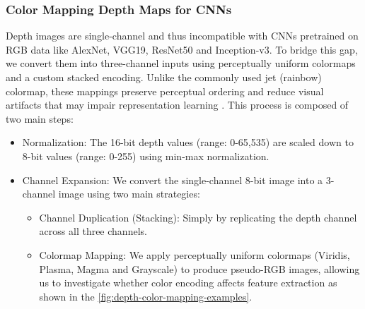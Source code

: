 
\subsubsection{Color Mapping Depth Maps for CNNs}
Depth images are single-channel and thus incompatible with CNNs pretrained on RGB data like AlexNet, VGG19, ResNet50 and Inception-v3. To bridge this gap, we convert them into three-channel inputs using perceptually uniform colormaps and a custom stacked encoding. Unlike the commonly used jet (rainbow) colormap, these mappings preserve perceptual ordering and reduce visual artifacts that may impair representation learning \cite{rainbow_harmful}. This process is composed of two main steps:

\begin{itemize}
    \item Normalization: The 16-bit depth values (range: 0-65,535) are scaled down to 8-bit values (range: 0-255) using min-max normalization.
    \item Channel Expansion: We convert the single-channel 8-bit image into a 3-channel image using two main strategies:
    \begin{itemize}
        \item Channel Duplication (Stacking): Simply by replicating the depth channel across all three channels.
        \item Colormap Mapping: We apply perceptually uniform colormaps (Viridis, Plasma, Magma and Grayscale) to produce pseudo-RGB images, allowing us to investigate whether color encoding affects feature extraction as shown in the \autoref{fig:depth-color-mapping-examples}.
    \end{itemize}
\end{itemize}

